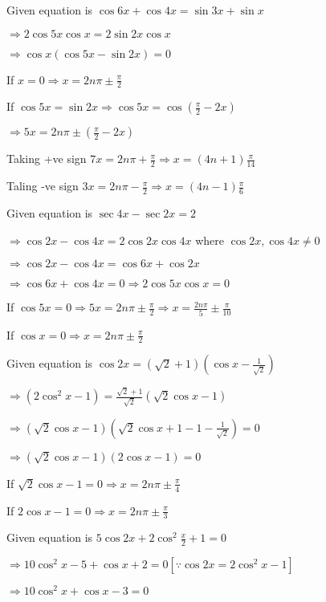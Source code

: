 \item Given equation is $\cos6x + \cos4x = \sin3x + \sin x$

  $\Rightarrow 2\cos5x\cos x = 2\sin2x\cos x$

  $\Rightarrow \cos x(\cos5x - \sin2x) = 0$

  If $x = 0 \Rightarrow x = 2n\pi\pm\frac{\pi}{2}$

  If $\cos5x = \sin2x \Rightarrow \cos5x = \cos\left(\frac{\pi}{2} - 2x\right)$

  $\Rightarrow 5x = 2n\pi\pm \left(\frac{\pi}{2} - 2x\right)$

  Taking +ve sign $7x = 2n\pi + \frac{\pi}{2} \Rightarrow x = (4n + 1)\frac{\pi}{14}$

  Taling -ve sign $3x = 2n\pi - \frac{\pi}{2} \Rightarrow x = (4n - 1)\frac{\pi}{6}$

\item Given equation is $\sec4x - \sec2x = 2$

  $\Rightarrow \cos2x - \cos4x = 2\cos2x\cos4x$ where $\cos2x, \cos4x\neq 0$

  $\Rightarrow \cos2x - \cos4x = \cos6x + \cos 2x$

  $\Rightarrow \cos6x + \cos4x = 0 \Rightarrow 2\cos5x\cos x = 0$

  If $\cos 5x = 0 \Rightarrow 5x = 2n\pi\pm\frac{\pi}{2}\Rightarrow x = \frac{2n\pi}{5}\pm\frac{\pi}{10}$

  If $\cos x = 0 \Rightarrow x = 2n\pi\pm\frac{\pi}{2}$

\item Given equation is $\cos2x = (\sqrt{2} + 1)\left(\cos x - \frac{1}{\sqrt{2}}\right)$

  $\Rightarrow (2\cos^2x - 1) = \frac{\sqrt{2} + 1}{\sqrt{2}}\left(\sqrt{2}\cos x - 1\right)$

  $\Rightarrow (\sqrt{2}\cos x - 1)\left(\sqrt{2}\cos x + 1 - 1 - \frac{1}{\sqrt{2}}\right) = 0$

  $\Rightarrow (\sqrt{2}\cos x - 1)(2\cos x - 1) = 0$

  If $\sqrt{2}\cos x - 1 = 0 \Rightarrow x = 2n\pi \pm \frac{\pi}{4}$

  If $2\cos x - 1 = 0 \Rightarrow x = 2n\pi\pm\frac{\pi}{3}$

\item Given equation is $5\cos2x + 2\cos^2\frac{x}{2} + 1 = 0$

  $\Rightarrow 10\cos^2x - 5 + \cos x + 2 = 0[\because \cos2x = 2\cos^2x - 1]$

  $\Rightarrow 10\cos^2x + \cos x - 3 = 0$

